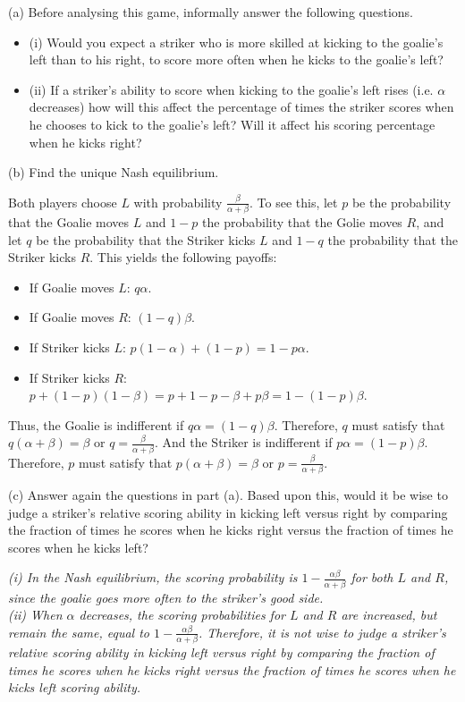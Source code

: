 \documentclass{article}
\begin{document}
(a) Before analysing this game, informally answer the following questions.

\begin{itemize}
\item (i) Would you expect a striker who is more skilled at kicking to the goalie's left than to his
right, to score more often when he kicks to the goalie's left?
\item (ii) If a striker's ability to score when kicking to the goalie's left rises (i.e. $\alpha$ decreases) how will this affect the percentage of times the striker scores when he chooses to kick to the goalie's left? Will it affect his scoring percentage when he kicks right?

\end{itemize}



(b) Find the unique Nash equilibrium.

Both players choose $L$ with probability $\tfrac{\beta}{\alpha + \beta}$. To see this, let $p$ be the probability that the Goalie moves $L$ and $1-p$ the probability that the Golie moves $R$, and let $q$ be the probability that the Striker kicks $L$ and $1-q$ the probability that the Striker kicks $R$. This yields the following payoffs:
    \begin{itemize}
    \item If Goalie moves $L$: $q\alpha$.
    \item If Goalie moves $R$: $(1-q)\beta$.
    \item If Striker kicks $L$: $p(1-\alpha) + (1-p) = 1 - p\alpha$.
    \item If Striker kicks $R$: $p + (1-p)(1-\beta) = p + 1 - p - \beta + p\beta = 1 - (1-p)\beta$.
    \end{itemize}
    Thus, the Goalie is indifferent if $q\alpha = (1-q)\beta$. Therefore, $q$ must satisfy that $q(\alpha+\beta) = \beta$ or $q = \frac{\beta}{\alpha+\beta}$. And the Striker is indifferent if $p\alpha = (1-p)\beta$. Therefore, $p$ must satisfy that $p(\alpha+\beta) = \beta$ or $p = \frac{\beta}{\alpha+\beta}$.
    
(c) Answer again the questions in part (a). Based upon this, would it be wise to judge a striker's
relative scoring ability in kicking left versus right by comparing the fraction of times he scores
when he kicks right versus the fraction of times he scores when he kicks left?

\textit{(i) In the Nash equilibrium, the scoring probability is $1 - \tfrac{\alpha \beta}{\alpha + \beta}$ for both $L$ and $R$, since the goalie goes more often to the striker's good side. \\ (ii) When $\alpha$ decreases, the scoring probabilities for $L$ and $R$ are increased, but remain the same, equal to $1 - \tfrac{\alpha \beta}{\alpha + \beta}$. Therefore, it is not wise to judge a striker's relative scoring ability in kicking left versus right by comparing the fraction of times he scores when he kicks right versus the fraction of times he scores when he kicks left scoring ability.}
\end{document}
